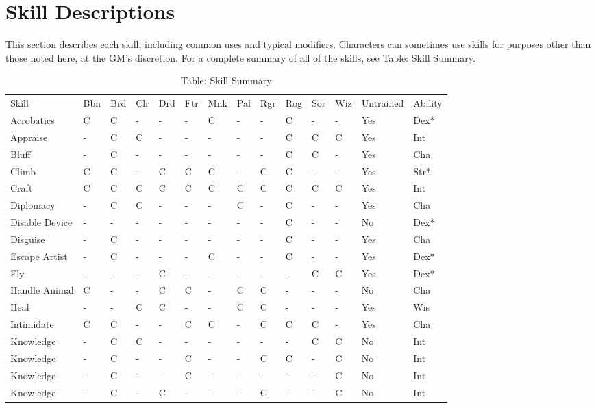 \chapter{Skill Descriptions}

\label{f0}				
This section describes each skill, including common uses and typical modifiers. Characters can sometimes use skills for purposes other than those noted here, at the GM's discretion. For a complete summary of all of the skills, see Table: Skill Summary.

\begin{table*}[]
\sffamily
\caption{Table: Skill Summary}
\begin{tabular}{llllllllllllll}
Skill & Bbn & Brd & Clr & Drd & Ftr & Mnk & Pal & Rgr & Rog & Sor & Wiz & Untrained & Ability\\
Acrobatics & C & C & - & - & - & C & - & - & C & - & - & Yes & Dex*\\
Appraise & - & C & C & - & - & - & - & - & C & C & C & Yes & Int\\
Bluff & - & C & - & - & - & - & - & - & C & C & - & Yes & Cha\\
Climb & C & C & - & C & C & C & - & C & C & - & - & Yes & Str*\\
Craft & C & C & C & C & C & C & C & C & C & C & C & Yes & Int\\
Diplomacy & - & C & C & - & - & - & C & - & C & - & - & Yes & Cha\\
Disable Device & - & - & - & - & - & - & - & - & C & - & - & No & Dex*\\
Disguise & - & C & - & - & - & - & - & - & C & - & - & Yes & Cha\\
Escape Artist & - & C & - & - & - & C & - & - & C & - & - & Yes & Dex*\\
Fly & - & - & - & C & - & - & - & - & - & C & C & Yes & Dex*\\
Handle Animal & C & - & - & C & C & - & C & C & - & - & - & No & Cha\\
Heal & - & - & C & C & - & - & C & C & - & - & - & Yes & Wis\\
Intimidate & C & C & - & - & C & C & - & C & C & C & - & Yes & Cha\\
Knowledge & - & C & C & - & - & - & - & - & - & C & C & No & Int\\
Knowledge & - & C & - & - & C & - & - & C & C & - & C & No & Int\\
Knowledge & - & C & - & - & C & - & - & - & - & - & C & No & Int\\
Knowledge & - & C & - & C & - & - & - & C & - & - & C & No & Int\\

\end{tabular}
\end{table*}
